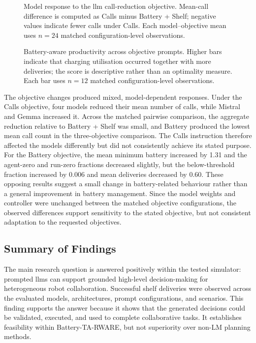 \begin{figure}[H]
\centering
\ChartCallAdaptability
\caption{Model response to the \gls{llm} call-reduction objective. Mean-call difference is computed as Calls minus Battery + Shelf; negative values indicate fewer calls under Calls. Each model--objective mean uses $n=24$ matched configuration-level observations.}
\label{fig:model_call_reduction_adaptability}
\end{figure}

\begin{figure}[H]
\centering
\ChartBatteryProductivity
\caption{Battery-aware productivity across objective prompts. Higher bars indicate that charging utilisation occurred together with more deliveries; the score is descriptive rather than an optimality measure. Each bar uses $n=12$ matched configuration-level observations.}
\label{fig:battery_aware_productivity}
\end{figure}

The objective changes produced mixed, model-dependent responses. Under the Calls objective, four models reduced their mean number of calls, while Mistral and Gemma increased it. Across the matched pairwise comparison, the aggregate reduction relative to Battery + Shelf was small, and Battery produced the lowest mean call count in the three-objective comparison. The Calls instruction therefore affected the models differently but did not consistently achieve its stated purpose. For the Battery objective, the mean minimum battery increased by 1.31 and the agent-zero and run-zero fractions decreased slightly, but the below-threshold fraction increased by 0.006 and mean deliveries decreased by 0.60. These opposing results suggest a small change in battery-related behaviour rather than a general improvement in battery management. Since the model weights and controller were unchanged between the matched objective configurations, the observed differences support sensitivity to the stated objective, but not consistent adaptation to the requested objectives.

\subsection{Summary of Findings}

The main research question is answered positively within the tested simulator: prompted \glspl{llm} can support grounded high-level decision-making for heterogeneous robot collaboration. Successful shelf deliveries were observed across the evaluated models, architectures, prompt configurations, and scenarios. This finding supports the answer because it shows that the generated decisions could be validated, executed, and used to complete collaborative tasks. It establishes feasibility within Battery-TA-RWARE, but not superiority over non-LM planning methods.

